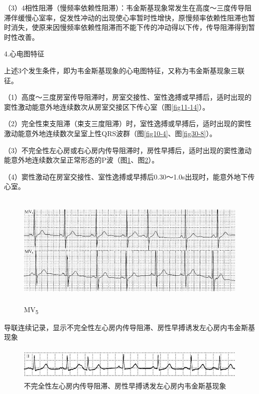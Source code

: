（3）4相性阻滞（慢频率依赖性阻滞）：韦金斯基现象常发生在高度～三度传导阻滞伴缓慢心室率，促发性冲动的出现使心率暂时性增快，原慢频率依赖性阻滞也暂时消失，使原来因慢频率依赖性阻滞而不能下传的冲动得以下传，传导阻滞得到暂时性改善。

4.心电图特征

上述3个发生条件，即为韦金斯基现象的心电图特征，又称为韦金斯基现象三联征。

（1）高度～三度房室传导阻滞时，房室交接性、室性逸搏或早搏后，适时出现的窦性激动能意外地连续数次从房室交接区下传心室（图\ref{fig11-14}）。

（2）完全性束支阻滞（束支三度阻滞）时，室性逸搏或早搏后，适时出现的窦性激动能意外地连续数次呈室上性QRS波群（图\ref{fig10-4}、图\ref{fig30-8}）。

（3）不完全性左心房或右心房内传导阻滞时，房性早搏后，适时出现的窦性激动能意外地连续数次呈正常形态的P波（图\ref{fig28-3}、图\ref{fig28-4}）。

（4）窦性激动在房室交接性、室性逸搏或早搏后0.30～1.0s出现时，能意外地下传心室。

\begin{figure}[!htbp]
 \centering
 \includegraphics[width=5.58333in,height=2.16667in]{./images/Image00463.jpg}
 \captionsetup{justification=centering}
 \caption{MV\textsubscript{5}}
 \label{fig28-3}
  \end{figure} 
导联连续记录，显示不完全性左心房内传导阻滞、房性早搏诱发左心房内韦金斯基现象

\begin{figure}[!htbp]
 \centering
 \includegraphics[width=5.60417in,height=0.625in]{./images/Image00464.jpg}
 \captionsetup{justification=centering}
 \caption{不完全性左心房内传导阻滞、房性早搏诱发左心房内韦金斯基现象}
 \label{fig28-4}
  \end{figure} 


